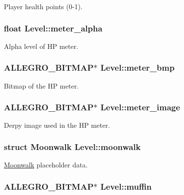 \-Player health points (0-\/1). \hypertarget{structLevel_a246ce1ecf1523db218cf067df15e511f}{
\subsubsection[{meter\-\_\-alpha}]{\setlength{\rightskip}{0pt plus 5cm}float {\bf \-Level\-::meter\-\_\-alpha}}}\label{structLevel_a246ce1ecf1523db218cf067df15e511f}
\-Alpha level of \-H\-P meter. \hypertarget{structLevel_a4e78a54cbf3cdcc804f65acb03cef0b3}{
\subsubsection[{meter\-\_\-bmp}]{\setlength{\rightskip}{0pt plus 5cm}\-A\-L\-L\-E\-G\-R\-O\-\_\-\-B\-I\-T\-M\-A\-P$\ast$ {\bf \-Level\-::meter\-\_\-bmp}}}\label{structLevel_a4e78a54cbf3cdcc804f65acb03cef0b3}
\-Bitmap of the \-H\-P meter. \hypertarget{structLevel_a371c97dfa3d564a19648cb1b72edbf60}{
\subsubsection[{meter\-\_\-image}]{\setlength{\rightskip}{0pt plus 5cm}\-A\-L\-L\-E\-G\-R\-O\-\_\-\-B\-I\-T\-M\-A\-P$\ast$ {\bf \-Level\-::meter\-\_\-image}}}\label{structLevel_a371c97dfa3d564a19648cb1b72edbf60}
\-Derpy image used in the \-H\-P meter. \hypertarget{structLevel_ab9e39b9ac0f342332e034c59d55d6a07}{
\subsubsection[{moonwalk}]{\setlength{\rightskip}{0pt plus 5cm}struct {\bf \-Moonwalk} {\bf \-Level\-::moonwalk}}}\label{structLevel_ab9e39b9ac0f342332e034c59d55d6a07}
\hyperlink{structMoonwalk}{\-Moonwalk} placeholder data. \hypertarget{structLevel_ad4d4190d232b674d4211f3355a9b7a93}{
\subsubsection[{muffin}]{\setlength{\rightskip}{0pt plus 5cm}\-A\-L\-L\-E\-G\-R\-O\-\_\-\-B\-I\-T\-M\-A\-P$\ast$ {\bf \-Level\-::muffin}}}\label{structLevel_ad4d4190d232b674d4211f3355a9b7a93}
